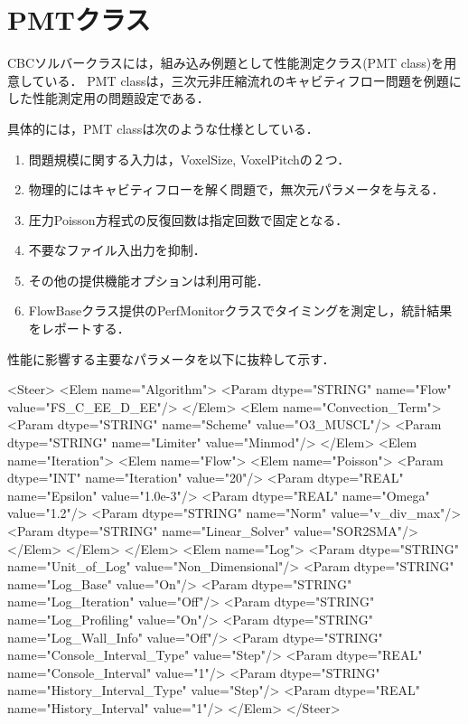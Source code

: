 
%
\graphicspath{{./fig_perf/}}

\section{PMTクラス}

CBCソルバークラスには，組み込み例題として性能測定クラス(PMT class)を用意している．
PMT classは，三次元非圧縮流れのキャビティフロー問題を例題にした性能測定用の問題設定である．

具体的には，PMT classは次のような仕様としている．
\begin{enumerate}
\item 問題規模に関する入力は，VoxelSize, VoxelPitchの２つ．
\item 物理的にはキャビティフローを解く問題で，無次元パラメータを与える．
\item 圧力Poisson方程式の反復回数は指定回数で固定となる．
\item 不要なファイル入出力を抑制．
\item その他の提供機能オプションは利用可能．
\item FlowBaseクラス提供のPerfMonitorクラスでタイミングを測定し，統計結果をレポートする．
\end{enumerate}

性能に影響する主要なパラメータを以下に抜粋して示す．
{ \small
\begin{program}
<Steer>
  <Elem name="Algorithm">
    <Param dtype="STRING" name="Flow" value="FS_C_EE_D_EE"/>
  </Elem>
  <Elem name="Convection_Term">
    <Param dtype="STRING" name="Scheme" value="O3_MUSCL"/>
    <Param dtype="STRING" name="Limiter" value="Minmod"/>
  </Elem>
  <Elem name="Iteration">
    <Elem name="Flow">
      <Elem name="Poisson">
        <Param dtype="INT" name="Iteration" value="20"/>
        <Param dtype="REAL" name="Epsilon" value="1.0e-3"/>
        <Param dtype="REAL" name="Omega" value="1.2"/>
        <Param dtype="STRING" name="Norm" value="v_div_max"/>
        <Param dtype="STRING" name="Linear_Solver" value="SOR2SMA"/>
      </Elem>
    </Elem>
  </Elem>
  <Elem name="Log">
    <Param dtype="STRING" name="Unit_of_Log" value="Non_Dimensional"/>
    <Param dtype="STRING" name="Log_Base" value="On"/>
    <Param dtype="STRING" name="Log_Iteration" value="Off"/>
    <Param dtype="STRING" name="Log_Profiling" value="On"/>
    <Param dtype="STRING" name="Log_Wall_Info" value="Off"/>
    <Param dtype="STRING" name="Console_Interval_Type" value="Step"/>
    <Param dtype="REAL" name="Console_Interval" value="1"/>
    <Param dtype="STRING" name="History_Interval_Type" value="Step"/>
    <Param dtype="REAL" name="History_Interval" value="1"/>
  </Elem>
</Steer>
\end{program}
}

